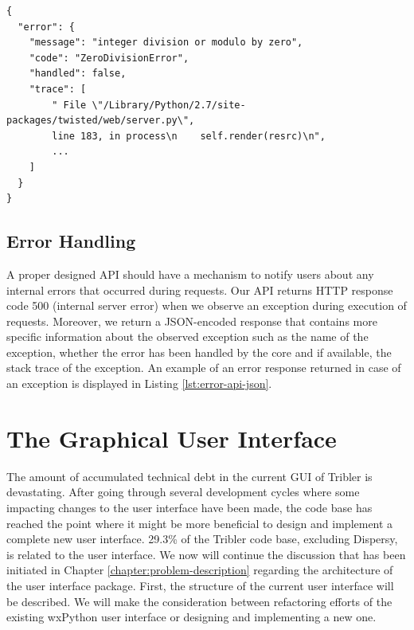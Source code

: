 \begin{lstlisting}[caption={The response in JSON format returned when an exception is observed in Tribler during the processing of an API request.},label={lst:error-api-json}]
{
  "error": {
    "message": "integer division or modulo by zero",
    "code": "ZeroDivisionError",
    "handled": false,
    "trace": [
        " File \"/Library/Python/2.7/site-packages/twisted/web/server.py\", 
        line 183, in process\n    self.render(resrc)\n", 
        ...
    ]
  }
}
\end{lstlisting}

\subsection{Error Handling}
\label{subsec:error-handling-api}
A proper designed API should have a mechanism to notify users about any internal errors that occurred during requests. Our API returns HTTP response code 500 (internal server error) when we observe an exception during execution of requests. Moreover, we return a JSON-encoded response that contains more specific information about the observed exception such as the name of the exception, whether the error has been handled by the core and if available, the stack trace of the exception. An example of an error response returned in case of an exception is displayed in Listing \ref{lst:error-api-json}.

\section{The Graphical User Interface}
The amount of accumulated technical debt in the current GUI of Tribler is devastating. After going through several development cycles where some impacting changes to the user interface have been made, the code base has reached the point where it might be more beneficial to design and implement a complete new user interface. 29.3\% of the Tribler code base, excluding Dispersy, is related to the user interface. We now will continue the discussion that has been initiated in Chapter \ref{chapter:problem-description} regarding the architecture of the user interface package. First, the structure of the current user interface will be described. We will make the consideration between refactoring efforts of the existing wxPython user interface or designing and implementing a new one.

